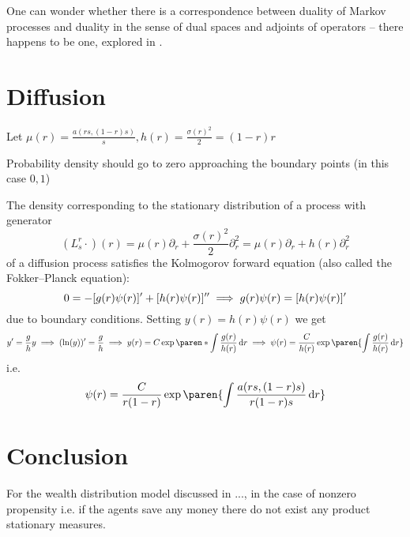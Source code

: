 \documentclass{article}
\begin{document}
One can wonder whether there is a correspondence between duality of Markov processes and duality in the sense of dual spaces and adjoints of operators -- there happens to be one, explored in \cite{2012arXiv1210.7193J}. %




\section{Diffusion}


Let $\mu(r) = \frac{a(rs, (1-r)s)}{s}, h(r) = \frac{\sigma(r)^2}{2}=(1-r)r$

Probability density should go to zero approaching the boundary points (in this case $0, 1$) 

The density corresponding to the stationary distribution of a process with generator
\[
(L_s^r \cdot)(r)
= \mu(r) \partial_r + \frac{\sigma(r)^2}{2} \partial_r^2
= \mu(r) \partial_r + h(r) \partial_r^2
\]
of a diffusion process satisfies the Kolmogorov forward equation (also called the Fokker--Planck equation): %
\[
0 = -[g(r) \psi(r)]' + [h(r) \psi(r)]''
\\\implies g(r) \psi(r) = [h(r) \psi(r)]'
\]
due to boundary conditions. Setting $y(r) = h(r) \psi(r)$ we get
\[
y' = \frac{g}{h} y \implies (\ln(y))' = \frac{g}{h}
\\ \implies y(r) = C \exp\paren*{ \int \frac{g(r)}{h(r)}\diff r }
\\ \implies \psi(r) = \frac{C}{h(r)} \exp\paren{ \int \frac{g(r)}{h(r)}\diff r }
\]
i.e.
\[
\psi(r) = \frac{C}{r(1-r)} \exp\paren{ \int \frac{a(rs, (1-r)s)}{r(1-r)s}\diff r }
\]


\section*{Conclusion}
For the wealth distribution model discussed in ..., in the case of nonzero propensity i.e. if the agents save any money there do not exist any product stationary measures.



\printbibliography
\end{document}
